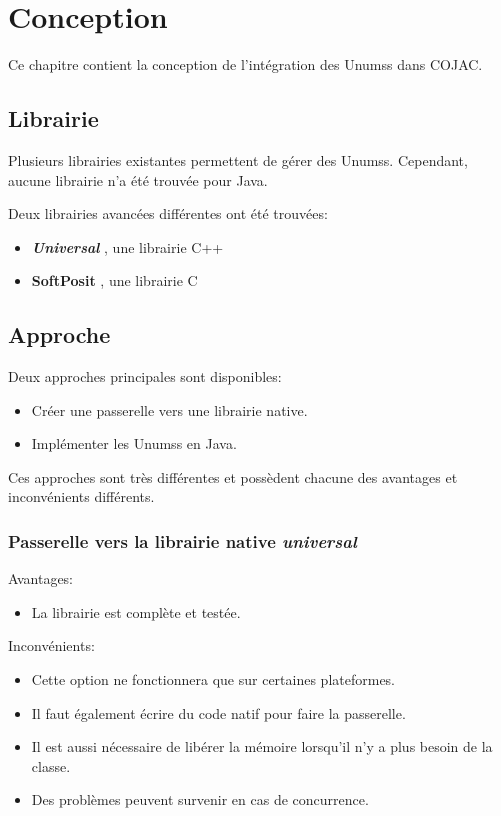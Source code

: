 \section{Conception}

Ce chapitre contient la conception de l'intégration des \glspl{Unums} dans \gls{COJAC}.

\subsection{Librairie}

Plusieurs librairies existantes permettent de gérer des \glspl{Unums}. Cependant, aucune librairie n'a été trouvée pour Java.

Deux librairies avancées différentes ont été trouvées:
\begin{itemize}
    \item \textbf{\textit{Universal}} \cite{universal-github}, une librairie C++
    \item \textbf{\Gls{SoftPosit}} \cite{softposit-gitlab}, une librairie C
\end{itemize}

\subsection{Approche}

Deux approches principales sont disponibles:
\begin{itemize}
    \item Créer une passerelle vers une librairie native.
    \item Implémenter les \glspl{Unums} en Java.
\end{itemize}

Ces approches sont très différentes et possèdent chacune des avantages et inconvénients différents.

\subsubsection{Passerelle vers la librairie native \textit{universal}}

Avantages:
\begin{itemize}
    \item La librairie est complète et testée.
\end{itemize}

Inconvénients:
\begin{itemize}
    \item Cette option ne fonctionnera que sur certaines plateformes.
    \item Il faut également écrire du code natif pour faire la passerelle.
    \item Il est aussi nécessaire de libérer la mémoire lorsqu'il n'y a plus besoin de la classe.
    \item Des problèmes peuvent survenir en cas de concurrence.
\end{itemize}

